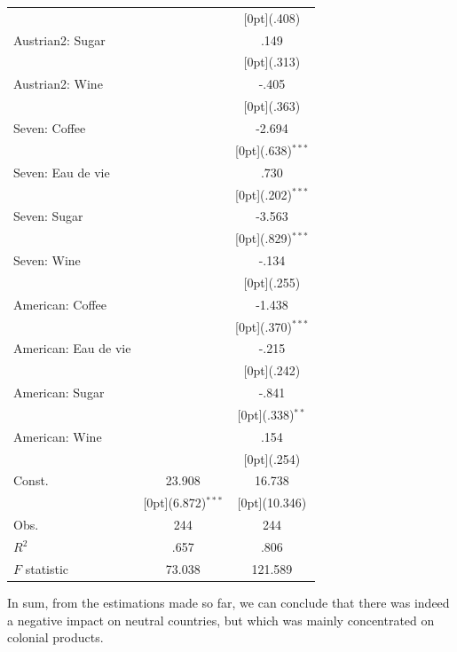 \documentclass[12pt,a4paper,titlepage]{article}
\begin{document}
{\begin{tabular*}{\textwidth}{@{\extracolsep{\fill}}lcc}
&	&	\raisebox{.7ex}[0pt]{\scriptsize (.408)} \\
Austrian2: Sugar &	&	.149 \\
&	&	\raisebox{.7ex}[0pt]{\scriptsize (.313)} \\
Austrian2: Wine &	&	-.405 \\
&	&	\raisebox{.7ex}[0pt]{\scriptsize (.363)} \\
Seven: Coffee &	&	-2.694 \\
&	&	\raisebox{.7ex}[0pt]{\scriptsize (.638)$^{***}$} \\
Seven: Eau de vie &	&	.730 \\
&	&	\raisebox{.7ex}[0pt]{\scriptsize (.202)$^{***}$} \\
Seven: Sugar &	&	-3.563 \\
&	&	\raisebox{.7ex}[0pt]{\scriptsize (.829)$^{***}$} \\
Seven: Wine &	&	-.134 \\
&	&	\raisebox{.7ex}[0pt]{\scriptsize (.255)} \\
American: Coffee &	&	-1.438 \\
&	&	\raisebox{.7ex}[0pt]{\scriptsize (.370)$^{***}$} \\
American: Eau de vie &	&	-.215 \\
&	&	\raisebox{.7ex}[0pt]{\scriptsize (.242)} \\
American: Sugar &	&	-.841 \\
&	&	\raisebox{.7ex}[0pt]{\scriptsize (.338)$^{**}$} \\
American: Wine &	&	.154 \\
&	&	\raisebox{.7ex}[0pt]{\scriptsize (.254)} \\
Const. &	23.908 &	16.738 \\
&	\raisebox{.7ex}[0pt]{\scriptsize (6.872)$^{***}$} &	\raisebox{.7ex}[0pt]{\scriptsize (10.346)} \\
Obs. &	244 &	244 \\
$ R^2$ &	.657 &	.806 \\
$ F$ statistic &	73.038 &	121.589 \\
\hline\hline		
\end{tabular*}}

In sum, from the estimations made so far, we can conclude that there was indeed a negative impact on neutral countries, but which was mainly concentrated on colonial products. 
\end{document}
